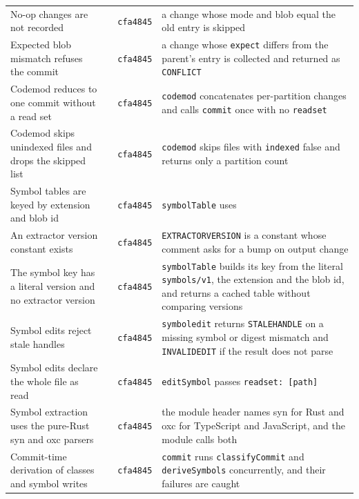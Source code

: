 \documentclass[11pt,letterpaper]{article}
\theoremstyle{definition}
\theoremstyle{remark}
\DeclareRobustCommand{\code}[1]{{\def\_{\textunderscore\allowbreak}\texttt{#1}}}
\begin{document}
\begin{small}
\begin{longtable}{@{}L{3.4cm}L{5.0cm}L{1.3cm}L{5.0cm}@{}}
No-op changes are not recorded &  & \code{cfa4845} & a change whose mode and blob equal the old entry is skipped \\
Expected blob mismatch refuses the commit &  & \code{cfa4845} & a change whose \code{expect} differs from the parent's entry is collected and returned as \code{CONFLICT} \\
Codemod reduces to one commit without a read set &  & \code{cfa4845} & \code{codemod} concatenates per-partition changes and calls \code{commit} once with no \code{read\_set} \\
Codemod skips unindexed files and drops the skipped list &  & \code{cfa4845} & \code{codemod} skips files with \code{indexed} false and returns only a partition count \\
Symbol tables are keyed by extension and blob id &  & \code{cfa4845} & \code{symbolTable} uses  \\
An extractor version constant exists &  & \code{cfa4845} & \code{EXTRACTOR\_VERSION} is a constant whose comment asks for a bump on output change \\
The symbol key has a literal version and no extractor version &  & \code{cfa4845} & \code{symbolTable} builds its key from the literal \code{symbols/v1}, the extension and the blob id, and returns a cached table without comparing versions \\
Symbol edits reject stale handles &  & \code{cfa4845} & \code{symbol\_edit} returns \code{STALE\_HANDLE} on a missing symbol or digest mismatch and \code{INVALID\_EDIT} if the result does not parse \\
Symbol edits declare the whole file as read &  & \code{cfa4845} & \code{editSymbol} passes \code{read\_set: [path]} \\
Symbol extraction uses the pure-Rust syn and oxc parsers &  & \code{cfa4845} & the module header names syn for Rust and oxc for TypeScript and JavaScript, and the module calls both \\
Commit-time derivation of classes and symbol writes &  & \code{cfa4845} & \code{commit} runs \code{classifyCommit} and \code{deriveSymbols} concurrently, and their failures are caught \\

\end{longtable}
\end{small}
\end{document}
